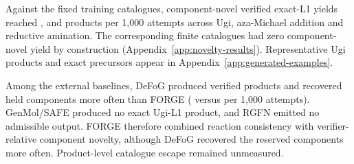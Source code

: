 \begin{table}[htbp]
\caption{\textbf{Exact Ugi assembly with precursor constitutions absent from
method-visible training.} Values are mean $\pm$ sample standard deviation per 1,000 attempts across
three seeds under a common component-disjoint protocol and verifier. Component-novel is
verifier-relative and does not establish strong product-level catalogue escape. Whole-molecule
baselines are assessed post hoc. $\dagger$, structural zero; N/E, not estimable.}
\label{tab:ugi-common-benchmark}
\centering
\scriptsize
\setlength{\tabcolsep}{2.2pt}
\end{table}

Against the fixed training catalogues, component-novel verified exact-L1 yields reached
\ForgeProseCatalogueForgeUgiComponentNovelPerThousand{},
\ForgeProseCatalogueForgeBLComponentNovelPerThousand{} and
\ForgeProseCatalogueForgeLXComponentNovelPerThousand{} products per 1,000 attempts across Ugi,
aza-Michael addition and reductive amination. The corresponding finite catalogues had zero
component-novel yield by construction (Appendix~\ref{app:novelty-results}). Representative Ugi
products and exact precursors appear in Appendix~\ref{app:generated-examples}.

Among the external baselines, DeFoG produced \ForgeProseCommonDefogExactPerThousand{} verified
products and recovered held components more often than FORGE
(\ForgeProseCommonDefogHeldPerThousand{} versus \ForgeProseCommonForgeHeldPerThousand{} per 1,000
attempts). GenMol/SAFE produced no exact Ugi-L1 product, and RGFN emitted no admissible output. FORGE therefore combined reaction consistency with verifier-relative component novelty,
although DeFoG recovered the reserved components more often. Product-level catalogue escape
remained unmeasured.

